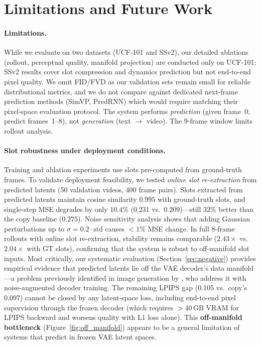 \documentclass{article}
\begin{document}
\section{Limitations and Future Work}
\label{sec:limitations}

\paragraph{Limitations.}
While we evaluate on two datasets (UCF-101 and SSv2), our detailed
ablations (rollout, perceptual quality, manifold projection) are
conducted only on UCF-101; SSv2 results cover slot compression and
dynamics prediction but not end-to-end pixel quality.
We omit FID/FVD as our validation sets remain small for reliable
distributional metrics, and we do not compare against dedicated
next-frame prediction methods (SimVP, PredRNN) which would require
matching their pixel-space evaluation protocol.
The system performs \emph{prediction} (given frame~0, predict
frames~1--8), not \emph{generation} (text $\to$ video).
The 9-frame window limits rollout analysis.

\paragraph{Slot robustness under deployment conditions.}
Training and ablation experiments use slots pre-computed from
ground-truth frames. To validate deployment feasibility, we tested
\emph{online slot re-extraction} from predicted latents
(50 validation videos, 400 frame pairs).
Slots extracted from predicted latents maintain cosine similarity
$0.995$ with ground-truth slots, and single-step MSE degrades by
only $10.4\%$ ($0.231$ vs.\ $0.209$)---still $32\%$ better than
the copy baseline ($0.275$).
Noise sensitivity analysis shows that adding Gaussian perturbations
up to $\sigma{=}0.2 \cdot \text{std}$ causes $<\!1\%$ MSE change.
In full 8-frame rollouts with online slot re-extraction, stability
remains comparable ($2.43\times$ vs.\ $2.04\times$ with GT slots),
confirming that the system is robust to off-manifold slot inputs.
Most critically, our systematic evaluation (Section~\ref{sec:negative})
provides empirical evidence that predicted latents lie off the VAE
decoder's data manifold---a problem previously identified in image
generation by \cite{zheng2025raedit}, who address it with
noise-augmented decoder training.
The remaining LPIPS gap (0.105 vs.\ copy's 0.097) cannot be closed by
any latent-space loss, including end-to-end pixel supervision through
the frozen decoder (which requires $>$40\,GB VRAM for LPIPS backward
and worsens quality with L1 loss alone).
This \textbf{off-manifold bottleneck} (Figure~\ref{fig:off_manifold})
appears to be a general limitation of systems that predict in frozen
VAE latent spaces.
\end{document}
